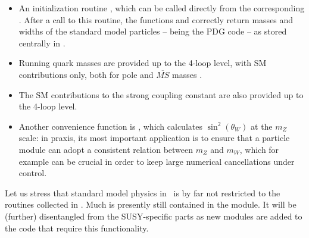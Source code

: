 \begin{itemize}
\item An initialization routine , which can be called directly from the corresponding 
        . After a call to this routine, the functions  and 
         correctly return masses and widths of the standard model particles 
        --  being the PDG code  \cite{Groom:2000in} -- as stored centrally in 
        .
\item Running quark masses are provided up to the 4-loop level, with SM contributions only, 
         both for pole and $\overline{MS}$ masses \cite{Chetyrkin:2000yt}.
\item The SM contributions to the strong coupling constant are also provided up to the 4-loop level.
 \item Another convenience function is , which calculates $\sin^2(\theta_W)$ at the 
         $m_Z$ scale: in praxis, its most important application is to ensure that a particle module can adopt a 
         consistent relation between $m_Z$ and $m_W$, which for example can be crucial in order to 
         keep large numerical cancellations under control.
\end{itemize}

Let us stress that standard model physics in \ds\  is by far not restricted to the 
routines collected in . Much is presently still contained in the  module.
It will be (further) disentangled from the SUSY-specific parts as new modules are added to the code that
require this functionality. 


